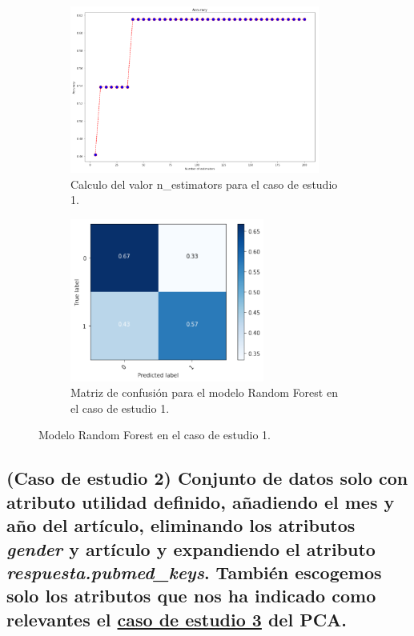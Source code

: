 \begin{figure}[!htb]
    \begin{subfigure}[b]{0.45\linewidth}
    	\centering
	    \includegraphics[width=0.9\textwidth]{images/resultados_rf_ent_conjunto1.png}
    	\caption{Calculo del valor n\_estimators para el caso de estudio 1.}
		\label{rfTrainCase1}
	\end{subfigure}
	\begin{subfigure}[b]{0.45\linewidth} 
		\centering
		\includegraphics[width=0.7\textwidth]{images/resultados_rf_cm_conjunto1.png}
		\caption{Matriz de confusión para el modelo Random Forest en el caso de estudio 1.}
		\label{rfCMCase1}
	\end{subfigure}
	\caption{Modelo Random Forest en el caso de estudio 1.}
	\label{rfCase1}
\end{figure}

\subsection{(Caso de estudio 2) Conjunto de datos solo con atributo utilidad definido, añadiendo el mes y año del artículo, eliminando los atributos \textit{gender} y artículo y expandiendo el atributo \textit{respuesta.pubmed\_keys}. También escogemos solo los atributos que nos ha indicado como relevantes el \hyperref[result:pca_case3]{caso de estudio 3} del PCA.}


